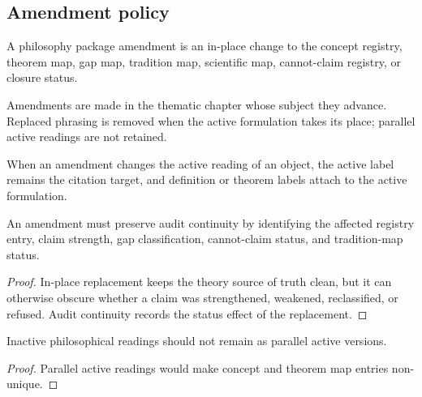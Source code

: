 \subsection{Amendment policy}
\label{subsec:philosophy-package-amendment-policy}

\begin{definition}
\label{def:philosophy-package-amendment}
A philosophy package amendment is an in-place change to the concept
registry, theorem map, gap map, tradition map, scientific map,
cannot-claim registry, or closure status.
\end{definition}

\begin{definition}
\label{def:philosophy-package-in-place-amendment}
Amendments are made in the thematic chapter whose subject they advance.
Replaced phrasing is removed when the active formulation takes its
place; parallel active readings are not retained.
\end{definition}

\begin{definition}
\label{def:philosophy-package-active-label}
When an amendment changes the active reading of an object, the active
label remains the citation target, and definition or theorem labels
attach to the active formulation.
\end{definition}

\begin{theorem}
\label{thm:philosophy-package-amendment-audit-continuity}
An amendment must preserve audit continuity by identifying the affected
registry entry, claim strength, gap classification, cannot-claim
status, and tradition-map status.
\end{theorem}
\begin{proof}
In-place replacement keeps the theory source of truth clean, but it can
otherwise obscure whether a claim was strengthened, weakened,
reclassified, or refused. Audit continuity records the status effect of
the replacement.
\end{proof}

\begin{corollary}
\label{cor:philosophy-package-no-stacked-interpretations}
Inactive philosophical readings should not remain as parallel active
versions.
\end{corollary}
\begin{proof}
Parallel active readings would make concept and theorem map entries
non-unique.
\end{proof}

